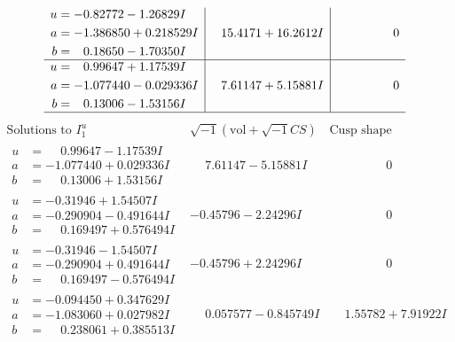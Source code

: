 \documentclass[1p]{elsarticle_modified}
\theoremstyle{definition}
\newcommand{\I}{\sqrt{-1}}
\begin{document}
$$\begin{array}{c|c|c}
\begin{aligned}
u &= -0.82772 - 1.26829 I \\
a &= -1.386850 + 0.218529 I \\
b &= \phantom{-}0.18650 - 1.70350 I\end{aligned}
 & \phantom{-}15.4171 + 16.2612 I & \phantom{-0.000000 } 0 \\ \hline\begin{aligned}
u &= \phantom{-}0.99647 + 1.17539 I \\
a &= -1.077440 - 0.029336 I \\
b &= \phantom{-}0.13006 - 1.53156 I\end{aligned}
 & \phantom{-}7.61147 + 5.15881 I & \phantom{-0.000000 } 0\\
 \hline 
 \end{array}$$\newpage$$\begin{array}{c|c|c}  
\text{Solutions to }I^u_{1}& \I (\text{vol} + \sqrt{-1}CS) & \text{Cusp shape}\\
 \hline 
\begin{aligned}
u &= \phantom{-}0.99647 - 1.17539 I \\
a &= -1.077440 + 0.029336 I \\
b &= \phantom{-}0.13006 + 1.53156 I\end{aligned}
 & \phantom{-}7.61147 - 5.15881 I & \phantom{-0.000000 } 0 \\ \hline\begin{aligned}
u &= -0.31946 + 1.54507 I \\
a &= -0.290904 - 0.491644 I \\
b &= \phantom{-}0.169497 + 0.576494 I\end{aligned}
 & -0.45796 - 2.24296 I & \phantom{-0.000000 } 0 \\ \hline\begin{aligned}
u &= -0.31946 - 1.54507 I \\
a &= -0.290904 + 0.491644 I \\
b &= \phantom{-}0.169497 - 0.576494 I\end{aligned}
 & -0.45796 + 2.24296 I & \phantom{-0.000000 } 0 \\ \hline\begin{aligned}
u &= -0.094450 + 0.347629 I \\
a &= -1.083060 + 0.027982 I \\
b &= \phantom{-}0.238061 + 0.385513 I\end{aligned}
 & \phantom{-}0.057577 - 0.845749 I & \phantom{-}1.55782 + 7.91922 I \\ \hline\begin{aligned}

\end{aligned}
\end{array}$$
\end{document}

